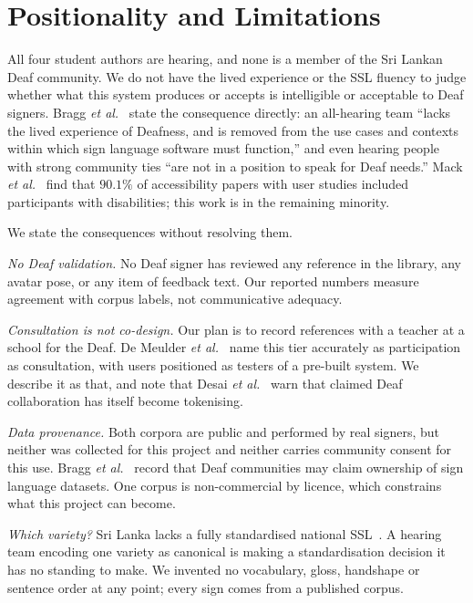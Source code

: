 \documentclass[conference]{IEEEtran}
\begin{document}
\section{Positionality and Limitations}
\label{sec:limits}

All four student authors are hearing, and none is a member of the Sri Lankan
Deaf community. We do not have the lived experience or the SSL fluency to
judge whether what this system produces or accepts is intelligible or
acceptable to Deaf signers. Bragg \emph{et al.}~\cite{bragg2019sign} state the
consequence directly: an all-hearing team ``lacks the lived experience of
Deafness, and is removed from the use cases and contexts within which sign
language software must function,'' and even hearing people with strong
community ties ``are not in a position to speak for Deaf needs.'' Mack
\emph{et al.}~\cite{mack2021what} find that $90.1\%$ of accessibility papers
with user studies included participants with disabilities; this work is in the
remaining minority.

We state the consequences without resolving them.

\emph{No Deaf validation.} No Deaf signer has reviewed any reference in the
library, any avatar pose, or any item of feedback text. Our reported numbers
measure agreement with corpus labels, not communicative adequacy.

\emph{Consultation is not co-design.} Our plan is to record references with a
teacher at a school for the Deaf. De Meulder \emph{et
al.}~\cite{demeulder2024lessons} name this tier accurately as participation as
consultation, with users positioned as testers of a pre-built system. We
describe it as that, and note that Desai \emph{et al.}~\cite{desai2024systemic}
warn that claimed Deaf collaboration has itself become tokenising.

\emph{Data provenance.} Both corpora are public and performed by real signers,
but neither was collected for this project and neither carries community
consent for this use. Bragg \emph{et al.}~\cite{bragg2021fate} record that
Deaf communities may claim ownership of sign language datasets. One corpus is
non-commercial by licence, which constrains what this project can become.

\emph{Which variety?} Sri Lanka lacks a fully standardised national
SSL~\cite{udugama2024sign}. A hearing team encoding one variety as canonical
is making a standardisation decision it has no standing to make. We invented
no vocabulary, gloss, handshape or sentence order at any point; every sign
comes from a published corpus.
\end{document}
